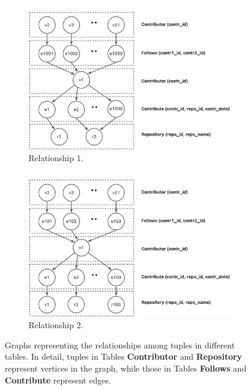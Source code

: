 {\begin{figure}
    \centering
    \begin{subfigure}[b]{0.4\linewidth}
        \centering
        \includegraphics[width=\linewidth]{./figures/intro-order-case.png}
        \caption{Relationship 1.}
        \label{fig:intro-order-case}
    \end{subfigure}
    \begin{subfigure}[b]{0.4\linewidth}
        \centering
        \includegraphics[width=\linewidth]{./figures/intro-order-case-2.png}
        \caption{Relationship 2.}
        \label{fig:intro-order-case2}
    \end{subfigure}
    \caption{Graphs representing the relationships among tuples in different tables. In detail, tuples in Tables \textbf{Contributor} and \textbf{Repository} represent vertices in the graph, while those in Tables \textbf{Follows} and \textbf{Contribute} represent edges.}
    \label{fig:intro-replace-example}
\end{figure}

}
